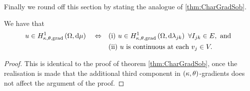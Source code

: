 Finally we round off this section by stating the analogue of \ref{thm:CharGradSob}.
\begin{theorem} \label{thm:ktGradSobChar}
	We have that
	\begin{align*}
		u\in\ktgradSob{\ddom}{\ddmes} \quad \Leftrightarrow 
		&\quad\text{(i)} \ u\in\ktgradSob{\ddom}{\lambda_{jk}} \ \forall I_{jk}\in E, \text{ and}\\
		&\quad\text{(ii)} \ u \text{ is continuous at each } v_j\in V.
	\end{align*}
\end{theorem}
\begin{proof}
	This is identical to the proof of theorem \ref{thm:CharGradSob}, once the realisation is made that the additional third component in $\left( \kappa, \theta \right)$-gradients does not affect the argument of the proof.
\end{proof}

